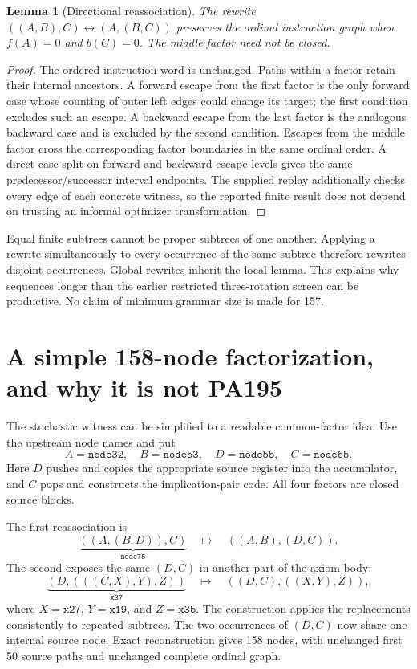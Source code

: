 \documentclass[11pt,letterpaper]{article}
\newtheorem{lemma}[theorem]{Lemma}
\begin{document}
\begin{lemma}[Directional reassociation]
The rewrite $((A,B),C)\leftrightarrow(A,(B,C))$ preserves the ordinal
instruction graph when $f(A)=0$ and $b(C)=0$. The middle factor need not
be closed.
\end{lemma}
\begin{proof}
The ordered instruction word is unchanged. Paths within a factor retain
their internal ancestors. A forward escape from the first factor is the
only forward case whose counting of outer left edges could change its
target; the first condition excludes such an escape. A backward escape
from the last factor is the analogous backward case and is excluded by the
second condition. Escapes from the middle factor cross the corresponding
factor boundaries in the same ordinal order. A direct case split on
forward and backward escape levels gives the same predecessor/successor
interval endpoints. The supplied replay additionally checks every edge of
each concrete witness, so the reported finite result does not depend on
trusting an informal optimizer transformation.
\end{proof}

Equal finite subtrees cannot be proper subtrees of one another. Applying a
rewrite simultaneously to every occurrence of the same subtree therefore
rewrites disjoint occurrences. Global rewrites inherit the local lemma.
This explains why sequences longer than the earlier restricted
three-rotation screen can be productive. No claim of minimum grammar size
is made for 157.

\section{A simple 158-node factorization, and why it is not PA195}

The stochastic witness can be simplified to a readable common-factor idea.
Use the upstream node names and put
\[
 A=\mathtt{node32},\quad B=\mathtt{node53},\quad
 D=\mathtt{node55},\quad C=\mathtt{node65}.
\]
Here $D$ pushes and copies the appropriate source register into the
accumulator, and $C$ pops and constructs the implication-pair code. All
four factors are closed source blocks.

The first reassociation is
\[
 \underbrace{((A,(B,D)),C)}_{\mathtt{node75}}
 \quad\longmapsto\quad ((A,B),(D,C)).
\]
The second exposes the same $(D,C)$ in another part of the axiom body:
\[
 \underbrace{(D,(((C,X),Y),Z))}_{\mathtt{x37}}
 \quad\longmapsto\quad ((D,C),((X,Y),Z)),
\]
where $X=\mathtt{x27}$, $Y=\mathtt{x19}$, and $Z=\mathtt{x35}$.
The construction applies the replacements consistently to repeated
subtrees. The two occurrences of $(D,C)$ now share one internal source
node. Exact reconstruction gives 158 nodes, with unchanged first 50 source
paths and unchanged complete ordinal graph.
\end{document}
